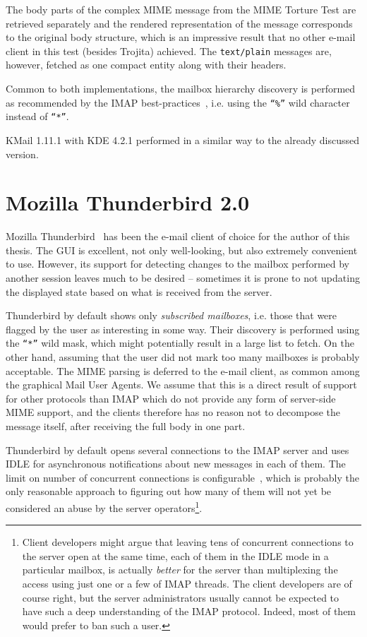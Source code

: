 \documentclass[12pt,notitlepage]{report}
\newcommand{\trojita}{Trojita\xspace}
\begin{document}
The body parts of the complex MIME message from the MIME Torture Test are
retrieved separately and the rendered representation of the message corresponds
to the original body structure, which is an impressive result that no other
e-mail client in this test (besides \trojita) achieved.  The {\tt text/plain}
messages are, however, fetched as one compact entity along with their headers.

Common to both implementations, the mailbox hierarchy discovery is performed as
recommended by the IMAP best-practices~\cite{client-best-practices}, i.e. using
the {\tt ``\%''} wild character instead of {\tt ``*''}.

KMail 1.11.1 with KDE 4.2.1 performed in a similar way to the already discussed
version.

\section{Mozilla Thunderbird 2.0}

Mozilla Thunderbird~\cite{thunderbird} has been the e-mail client of choice for
the author of this thesis.  The GUI is excellent, not only well-looking, but
also extremely convenient to use.  However, its support for detecting changes to
the mailbox performed by another session leaves much to be desired -- sometimes
it is prone to not updating the displayed state based on what is received from
the server.

Thunderbird by default shows only {\em subscribed mailboxes}, i.e. those that
were flagged by the user as interesting in some way.  Their discovery is
performed using the {\tt ``*''} wild mask, which might potentially result in a
large list to fetch.  On the other hand, assuming that the user did not mark
too many mailboxes is probably acceptable.  The MIME parsing is deferred to the
e-mail client, as common among the graphical Mail User Agents.  We assume that
this is a direct result of support for other protocols than IMAP which do not
provide any form of server-side MIME support, and the clients therefore has no
reason not to decompose the message itself, after receiving the full body in one
part.

Thunderbird by default opens several connections to the IMAP server and uses
IDLE for asynchronous notifications about new messages in each of them.  The
limit on number of concurrent connections is configurable~\cite{mozilla-imap},
which is probably the only reasonable approach to figuring out how many of them
will not yet be considered an abuse by the server operators\footnote{Client
developers might argue that leaving tens of concurrent connections to the server
open at the same time, each of them in the IDLE mode in a particular mailbox, is
actually {\em better} for the server than multiplexing the access using just one
or a few of IMAP threads.  The client developers are of course right, but the
server administrators usually cannot be expected to have such a deep
understanding of the IMAP protocol.  Indeed, most of them would prefer to ban
such a user.}.
\end{document}
